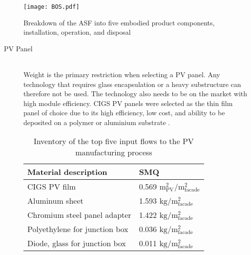 \begin{figure}[ht]
\begin{center}
\texttt{[image: BOS.pdf]}
\caption{Breakdown of the ASF into five embodied product components, installation, operation, and disposal}

\label{fig:BOS}
\end{center}
\end{figure}

\begin{description}

\item[PV Panel] \hfill\\
Weight is the primary restriction when selecting a PV panel. Any technology that requires glass encapsulation or a heavy substructure can therefore not be used. The technology also needs to be on the market with high module efficiency. CIGS PV panels were selected as the thin film panel of choice due to its high efficiency, low cost, and ability to be deposited on a polymer or aluminium substrate \cite{chirilua2011highly}. 




\begin{table}[H]
\centering
\begin{tabular}{ll}
\hline
Material description & SMQ \\ \hline
CIGS PV film       	 & 0.569 ${\mathrm{m^2_{PV}/m^2_{facade}}}$\\
Aluminum sheet 	 & 1.593 ${\mathrm{kg/m^2_{facade}}}$\\
Chromium steel panel adapter  & 1.422 ${\mathrm{kg/m^2_{facade}}}$\\
Polyethylene for junction box & 0.036 ${\mathrm{kg/m^2_{facade}}}$\\
Diode, glass for junction box & 0.011 ${\mathrm{kg/m^2_{facade}}}$\\
\hline
\end{tabular}
\caption{Inventory of the top five input flows to the PV manufacturing process}
\label{tab:PVinv}
\end{table}


\end{description}
